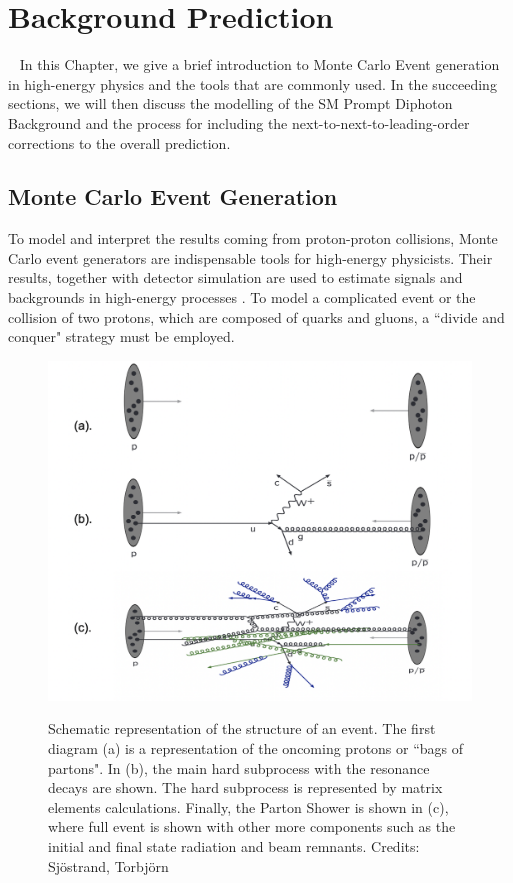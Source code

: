 \chapter{Background Prediction}~\label{ch:background}\RaggedRight \parindent=25pt
In this Chapter, we give a brief introduction to Monte Carlo Event generation in high-energy physics and the tools that are commonly used. In the succeeding sections, we will then discuss the modelling of the SM Prompt Diphoton Background and the process for including the next-to-next-to-leading-order corrections to the overall prediction. 

\section{Monte Carlo Event Generation}

To model and interpret the results coming from proton-proton collisions, Monte Carlo event generators are indispensable tools for high-energy physicists. Their results, together with detector simulation are used to estimate signals and backgrounds in high-energy processes \cite{Tanabashi:2018oca}. To model a complicated event or the collision of two protons, which are composed of quarks and gluons, a ``divide and conquer" strategy must be employed.  

\begin{figure}[!htbp]
    \caption{Schematic representation of the structure of an event. The first diagram (a) is a representation of the oncoming protons or ``bags of partons". In (b), the main hard subprocess with the resonance decays are shown. The hard subprocess is represented by matrix elements calculations. Finally, the Parton Shower is shown in (c), where full event is shown with other more components such as the initial and final state radiation and beam remnants. Credits: Sj{\"o}strand, Torbj{\"o}rn}
	\centering
	\includegraphics[scale=0.5]{fig/eventStructure.png}
	\label{fig:EventStructure}
\end{figure}


